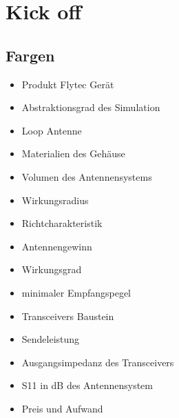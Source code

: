 \section{Kick off}
\subsection*{Fargen}
	\begin{itemize}
        \item Produkt Flytec Gerät
        \item Abstraktionsgrad des Simulation
        \item Loop Antenne
        \item Materialien des Gehäuse
        \item Volumen des Antennensystems
        \item Wirkungsradius
        \item Richtcharakteristik
        \item Antennengewinn
        \item Wirkungsgrad
        \item minimaler Empfangspegel
        \item Transceivers Baustein
        \item Sendeleistung
        \item Ausgangsimpedanz des Transceivers
        \item S11 in dB des Antennensystem
        \item Preis und Aufwand
	\end{itemize}


